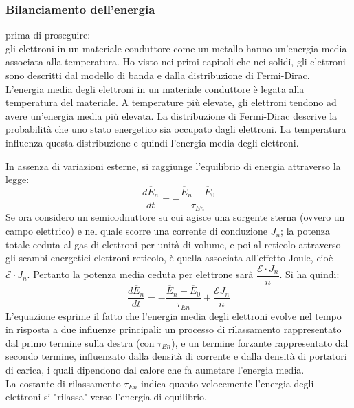 \subsubsection{Bilanciamento dell'energia}
%
\begin{ripasso}
    prima di proseguire:\\
    gli elettroni in un materiale conduttore come un metallo hanno un'energia media associata alla temperatura. Ho visto nei primi capitoli che nei solidi, gli elettroni sono descritti dal modello di banda e dalla distribuzione di Fermi-Dirac.\\
    L'energia media degli elettroni in un materiale conduttore è legata alla temperatura del materiale. A temperature più elevate, gli elettroni tendono ad avere un'energia media più elevata. La distribuzione di Fermi-Dirac descrive la probabilità che uno stato energetico sia occupato dagli elettroni. La temperatura influenza questa distribuzione e quindi l'energia media degli elettroni.\\
\end{ripasso}
%
In assenza di variazioni esterne, si raggiunge l'equilibrio di energia attraverso la legge:
%
\begin{equation*}
    \dfrac{d\overline{E}_n}{dt}=-\dfrac{\overline{E}_n-\overline{E}_0}{\tau_{En}}
\end{equation*}
%
Se ora considero un semicodnuttore su cui agisce una sorgente sterna (ovvero un campo elettrico) e nel quale scorre una corrente di conduzione $J_n$; la potenza totale ceduta al gas di elettroni per unità di volume, e poi al reticolo attraverso gli scambi energetici elettroni-reticolo, è quella associata all’effetto Joule, cioè $\mathcal{E}\cdot J_n$. Pertanto la potenza media ceduta per elettrone sarà $\dfrac{\mathcal{E}\cdot J_n}{n}$. Sì ha quindi: 
%
\begin{equation}
    \dfrac{d\overline{E}_n}{dt}=-\dfrac{\overline{E}_n - \overline{E}_0}{\tau_{En}}+ \dfrac{\mathcal{E} J_n}{n}
\end{equation}
%
L'equazione esprime il fatto che l'energia media degli elettroni evolve nel tempo in risposta a due influenze principali: un processo di rilassamento rappresentato dal primo termine sulla destra (con $\tau_{En}$), e un termine forzante rappresentato dal secondo termine, influenzato dalla densità di corrente e dalla densità di portatori di carica, i quali dipendono dal calore che fa aumetare l'energia media.\\
La costante di rilassamento $\tau_{En}$ indica quanto velocemente l'energia degli elettroni si "rilassa" verso l'energia di equilibrio.

